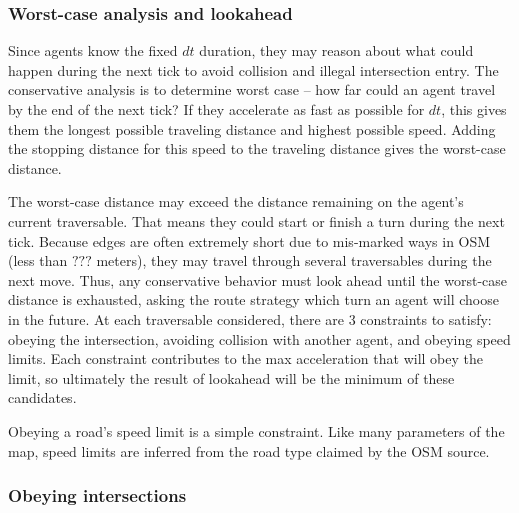 \documentclass[letterpaper, 10 pt, conference]{ieeeconf}  %
\begin{document}
\subsubsection{Worst-case analysis and lookahead}

Since agents know the fixed $dt$ duration, they may reason about what could
happen during the next tick to avoid collision and illegal intersection entry.
The conservative analysis is to determine worst case -- how far could an agent
travel by the end of the next tick? If they accelerate as fast as possible for
$dt$, this gives them the longest possible traveling distance and highest
possible speed. Adding the stopping distance for this speed to the traveling
distance gives the worst-case distance.


The worst-case distance may exceed the distance remaining on the agent's current
traversable. That means they could start or finish a turn during the next tick.
Because edges are often extremely short due to mis-marked ways in OSM (less than
$???$ meters), they may travel through several traversables during the next
move. Thus, any conservative behavior must look ahead until the worst-case
distance is exhausted, asking the route strategy which turn an agent will choose
in the future. At each traversable considered, there are 3 constraints to
satisfy: obeying the intersection, avoiding collision with another agent, and
obeying speed limits. Each constraint contributes to the max acceleration that
will obey the limit, so ultimately the result of lookahead will be the minimum
of these candidates.

Obeying a road's speed limit is a simple constraint. Like many parameters of the
map, speed limits are inferred from the road type claimed by the OSM
source.


\subsubsection{Obeying intersections}
\end{document}
